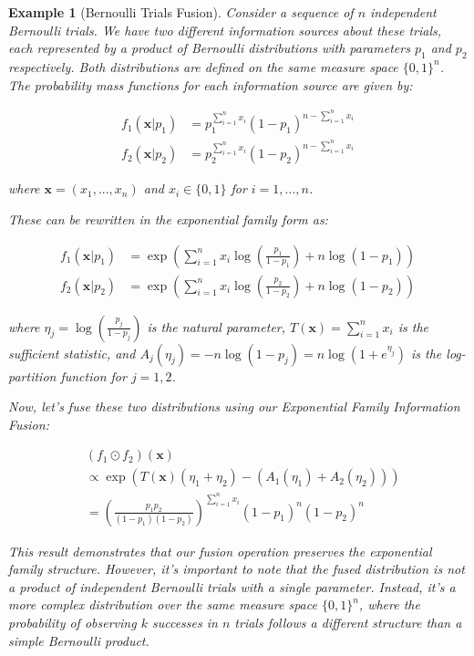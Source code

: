 \documentclass[letterpaper]{article} %
\newtheorem{example}[theorem]{Example}
\theoremstyle{definition}
\theoremstyle{remark}
\begin{document}
\begin{example}[Bernoulli Trials Fusion]
Consider a sequence of $n$ independent Bernoulli trials. We have two different information sources about these trials, each represented by a product of Bernoulli distributions with parameters $p_1$ and $p_2$ respectively. Both distributions are defined on the same measure space $\{0,1\}^n$. The probability mass functions for each information source are given by:

\begin{align*}
f_1(\mathbf{x}|p_1) &= p_1^{\sum_{i=1}^n x_i}(1-p_1)^{n-\sum_{i=1}^n x_i} \\
f_2(\mathbf{x}|p_2) &= p_2^{\sum_{i=1}^n x_i}(1-p_2)^{n-\sum_{i=1}^n x_i}
\end{align*}

where $\mathbf{x} = (x_1, ..., x_n)$ and $x_i \in \{0,1\}$ for $i = 1, ..., n$.

These can be rewritten in the exponential family form as:

\begin{align*}
f_1(\mathbf{x}|p_1) &= \exp\left(\sum_{i=1}^n x_i \log\left(\frac{p_1}{1-p_1}\right) + n\log(1-p_1)\right) \\
f_2(\mathbf{x}|p_2) &= \exp\left(\sum_{i=1}^n x_i \log\left(\frac{p_2}{1-p_2}\right) + n\log(1-p_2)\right)
\end{align*}

where $\eta_j = \log\left(\frac{p_j}{1-p_j}\right)$ is the natural parameter, $T(\mathbf{x}) = \sum_{i=1}^n x_i$ is the sufficient statistic, and $A_j(\eta_j) = -n\log(1-p_j) = n\log(1+e^{\eta_j})$ is the log-partition function for $j = 1, 2$.

Now, let's fuse these two distributions using our Exponential Family Information Fusion:

\begin{align*}
&(f_1 \odot f_2)(\mathbf{x}) \\
&\propto \exp\left(T(\mathbf{x})(\eta_1 + \eta_2) - (A_1(\eta_1) + A_2(\eta_2))\right) \\
&= \left(\frac{p_1p_2}{(1-p_1)(1-p_2)}\right)^{\sum_{i=1}^n x_i} (1-p_1)^n(1-p_2)^n
\end{align*}

This result demonstrates that our fusion operation preserves the exponential family structure. However, it's important to note that the fused distribution is not a product of independent Bernoulli trials with a single parameter. Instead, it's a more complex distribution over the same measure space $\{0,1\}^n$, where the probability of observing $k$ successes in $n$ trials follows a different structure than a simple Bernoulli product.
\end{example}
\end{document}
